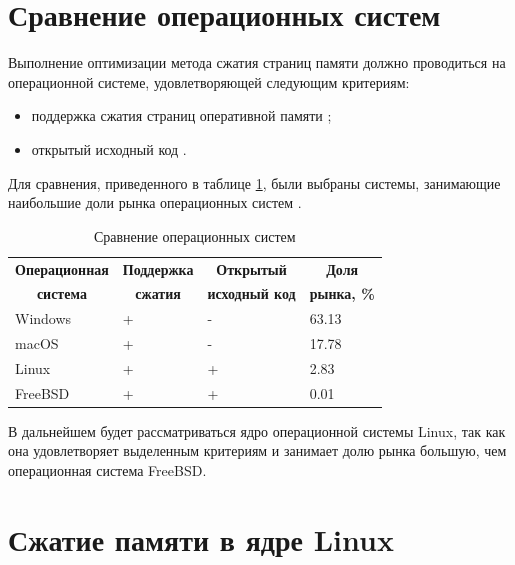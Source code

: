 \section{Сравнение операционных систем}\label{os}

Выполнение оптимизации метода сжатия страниц памяти должно проводиться на операционной системе, удовлетворяющей следующим критериям:

\begin{itemize}
	\item поддержка сжатия страниц оперативной памяти \cite{swapping};
	\item открытый исходный код \cite{open-os}.
\end{itemize}

Для сравнения, приведенного в таблице \ref{tab:comparison-os}, были выбраны системы, занимающие наибольшие доли рынка операционных систем \cite{stat}.

\begin{table}[h]
    \caption{Сравнение операционных систем}
    \begin{center}
        \begin{tabular}{|l|l|l|l|}
        		\hline
            \multicolumn{1}{|c}{\textbf{Операционная}} & 
            \multicolumn{1}{|c|}{\textbf{Поддержка}} &
            \multicolumn{1}{c|}{\textbf{Открытый}} &
            \multicolumn{1}{c|}{\textbf{Доля}} \\
            \multicolumn{1}{|c}{\textbf{система}} & 
            \multicolumn{1}{|c|}{\textbf{сжатия}} &
            \multicolumn{1}{c|}{\textbf{исходный код}} &
            \multicolumn{1}{c|}{\textbf{рынка, \%}} \\ \hline
            Windows &  + & - & 63.13 \\ \hline
            macOS & + & - & 17.78 \\ \hline
            Linux & + & + & 2.83 \\ \hline
            FreeBSD & + & + & 0.01 \\ \hline
        \end{tabular}
    \end{center}
    \label{tab:comparison-os}
\end{table}

В дальнейшем будет рассматриваться ядро операционной системы Linux, так как она удовлетворяет выделенным критериям и занимает долю рынка большую, чем операционная система FreeBSD.

\section{Сжатие памяти в ядре Linux}\label{linux-compression}

